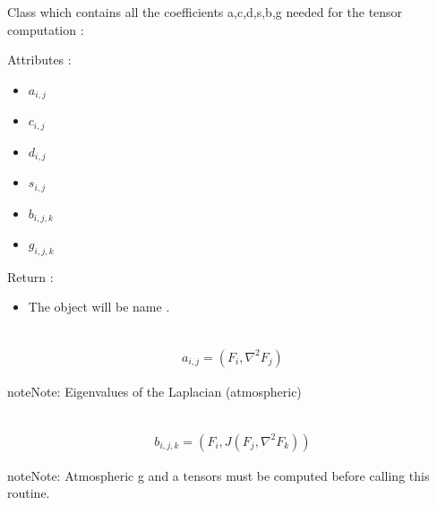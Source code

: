 \documentclass[letterpaper,10pt,english]{sphinxmanual}
\begin{document}
\begin{fulllineitems}
\label{rstfiles/inprod_analytic:inprod_analytic.atm_tensors}
Class which contains all the coefficients
a,c,d,s,b,g needed for the tensor computation :

Attributes :
\begin{itemize}
\item {} 
\(a_{i, j}\)

\item {} 
\(c_{i, j}\)

\item {} 
\(d_{i, j}\)

\item {} 
\(s_{i, j}\)

\item {} 
\(b_{i, j, k}\)

\item {} 
\(g_{i, j, k}\)

\end{itemize}

Return :
\begin{itemize}
\item {} 
The object will be name .

\end{itemize}

\begin{fulllineitems}
\label{rstfiles/inprod_analytic:inprod_analytic.atm_tensors.calculate_a}~\begin{equation*}
\begin{split}a_{i, j} = (F_i, {\nabla}^2 F_j)\end{split}
\end{equation*}
\begin{notice}{note}{Note:}
Eigenvalues of the Laplacian (atmospheric)
\end{notice}

\end{fulllineitems}


\begin{fulllineitems}
\label{rstfiles/inprod_analytic:inprod_analytic.atm_tensors.calculate_b}~\begin{equation*}
\begin{split}b_{i, j, k} = (F_i, J(F_j, \nabla^2 F_k))\end{split}
\end{equation*}
\begin{notice}{note}{Note:}
Atmospheric g and a tensors must be computed before calling this routine.
\end{notice}


\end{fulllineitems}
\end{fulllineitems}
\end{document}
